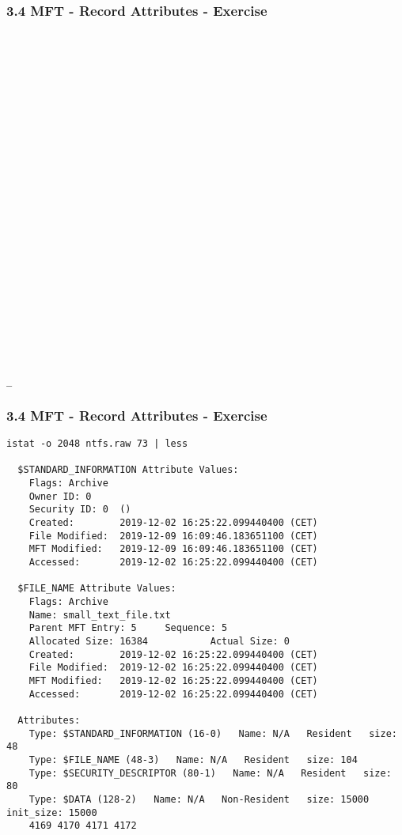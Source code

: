 \begin{frame}[fragile]
  \frametitle{3.4 MFT - Record Attributes - Exercise}
  \begin{lstlisting}[basicstyle=\tiny]


























_
  \end{lstlisting}
\end{frame}


\begin{frame}[fragile]
  \frametitle{3.4 MFT - Record Attributes - Exercise}
  \begin{lstlisting}[basicstyle=\tiny]
  istat -o 2048 ntfs.raw 73 | less

  $STANDARD_INFORMATION Attribute Values:
	Flags: Archive
	Owner ID: 0
	Security ID: 0  ()
	Created:        2019-12-02 16:25:22.099440400 (CET)
	File Modified:  2019-12-09 16:09:46.183651100 (CET)
	MFT Modified:   2019-12-09 16:09:46.183651100 (CET)
	Accessed:       2019-12-02 16:25:22.099440400 (CET)

  $FILE_NAME Attribute Values:
	Flags: Archive
	Name: small_text_file.txt
	Parent MFT Entry: 5     Sequence: 5
	Allocated Size: 16384           Actual Size: 0
	Created:        2019-12-02 16:25:22.099440400 (CET)
	File Modified:  2019-12-02 16:25:22.099440400 (CET)
	MFT Modified:   2019-12-02 16:25:22.099440400 (CET)
	Accessed:       2019-12-02 16:25:22.099440400 (CET)

  Attributes:
	Type: $STANDARD_INFORMATION (16-0)   Name: N/A   Resident   size: 48
	Type: $FILE_NAME (48-3)   Name: N/A   Resident   size: 104
	Type: $SECURITY_DESCRIPTOR (80-1)   Name: N/A   Resident   size: 80
	Type: $DATA (128-2)   Name: N/A   Non-Resident   size: 15000  init_size: 15000
	4169 4170 4171 4172
  \end{lstlisting}
\end{frame}


